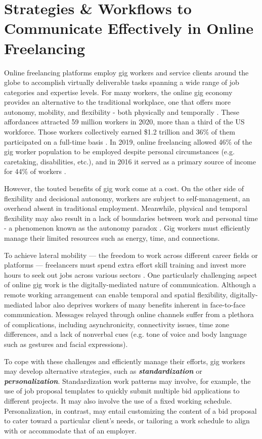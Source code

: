 \chapter{Strategies \& Workflows to Communicate Effectively in Online Freelancing}

Online freelancing platforms employ gig workers and service clients around the globe to accomplish virtually deliverable tasks spanning a wide range of job categories and expertise levels. For many workers, the online gig economy provides an alternative to the traditional workplace, one that offers more autonomy, mobility, and flexibility - both physically and temporally \cite{dunn2017digital, boundary}. These affordances attracted 59 million workers in 2020, more than a third of the US workforce. Those workers collectively earned \$1.2 trillion and 36\% of them participated on a full-time basis \cite{freelance-forward}. In 2019, online freelancing allowed 46\% of the gig worker population to be employed despite personal circumstances (e.g. caretaking, disabilities, etc.), and in 2016 it served as a primary source of income for 44\% of workers \cite{manyika2016independent}. 

However, the touted benefits of gig work come at a cost. On the other side of flexibility and decisional autonomy, workers are subject to self-management, an overhead absent in traditional employment. Meanwhile, physical and temporal flexibility may also result in a lack of boundaries between work and personal time - a phenomenon known as the autonomy paradox \cite{Shevchuk_Strebkov_Davis_2019}. Gig workers must efficiently manage their limited resources such as energy, time, and connections.

To achieve lateral mobility --- the freedom to work across different career fields or platforms --- freelancers must spend extra effort skill training and invest more hours to seek out jobs across various sectors \cite{boundary}. One particularly challenging aspect of online gig work is the digitally-mediated nature of communication. Although a remote working arrangement can enable temporal and spatial flexibility, digitally-mediated labor also deprives workers of many benefits inherent in face-to-face communication. Messages relayed through online channels suffer from a plethora of complications, including asynchronicity, connectivity issues, time zone differences, and a lack of nonverbal cues (e.g. tone of voice and body language such as gestures and facial expressions). 

To cope with these challenges and efficiently manage their efforts, gig workers may develop alternative strategies, such as \textbf{\textit{standardization}} or \textbf{\textit{personalization}}. Standardization work patterns may involve, for example, the use of job proposal templates to quickly submit multiple bid applications to different projects. It may also involve the use of a fixed working schedule. Personalization, in contrast, may entail customizing the content of a bid proposal to cater toward a particular client's needs, or tailoring a work schedule to align with or accommodate that of an employer.

